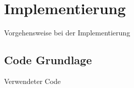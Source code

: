 \chapter{Implementierung}%

\label{cha:Implementierung}

Vorgehensweise bei der Implementierung

\section{Code Grundlage}
Verwendeter Code 

